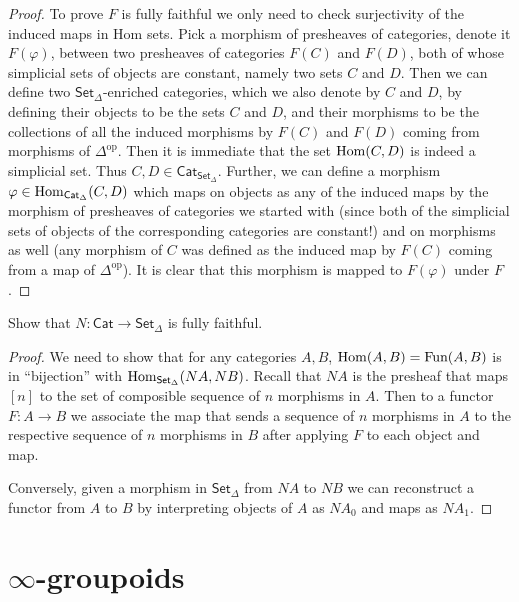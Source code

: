 \begin{proof}
To prove $F$ is fully faithful we only need to check surjectivity of
the induced maps in Hom sets. Pick a morphism of presheaves
of categories, denote it
$F(\varphi)$, between two presheaves of categories $F(C)$ and  $F(D)$,
both of whose simplicial sets of objects are constant, namely
two sets $C$ and $D$.
Then we can define two $\mathsf{Set}_\Delta$-enriched categories,
which we also denote by $C$ and $D$,
by defining their objects to be the sets $C$ and $D$, and their morphisms to be
the collections of all the induced morphisms by $F(C)$ and $F(D)$ coming from
morphisms of $\Delta^{\text{op}}$.
Then it is immediate that the set $\mathop{\mathrm{Hom}}\nolimits(C,D)$ is indeed a simplicial set.
Thus $C,D \in \mathsf{Cat}_{\mathsf{Set}_\Delta}$. Further, we
can define a morphism $\varphi \in \mathop{\mathrm{Hom}}\nolimits_{\mathsf{Cat}_\Delta}(C,D)$ 
which maps on objects as any of the induced maps by the morphism of presheaves
of categories we started with (since both of the simplicial sets of objects
of the corresponding categories are constant!)
and on morphisms as well (any morphism of $C$ was defined as the
induced map by $F(C)$ coming from a map of $\Delta^{\text{op}}$).
It is clear that this morphism is mapped to $F(\varphi)$ under $F$.
\end{proof}

\begin{exercise}[1.3]
\label{exercise-N-is-fully-faithful}
Show that $N:\mathsf{Cat}\to\mathsf{Set}_\Delta$ is fully faithful.
\end{exercise}

\begin{proof}
We need to show that for any categories $A,B$,
$\mathop{\mathrm{Hom}}\nolimits(A,B)=\text{Fun}(A,B)$ is in ``bijection'' with
$\mathop{\mathrm{Hom}}\nolimits_{\mathsf{Set}_\Delta}(NA,NB)$.
Recall that
$NA$ is the presheaf that maps $[n]$ to
the set of composible sequence of $n$ morphisms in $A$.
Then to a functor $F:A \to B$ we associate the
map that sends a sequence of $n$ morphisms in $A$ 
to the respective sequence of $n$ morphisms in $B$ 
after applying $F$ to each object and map.

Conversely, given a morphism in $\mathsf{Set}_\Delta$
from $NA$ to $NB$
we can reconstruct a functor from $A$ to $B$
 by interpreting objects of $A$ as $NA_0$ and 
maps as $NA_1$.
\end{proof}

\section{$\infty$-groupoids}
\label{section-infty-groupoids}


